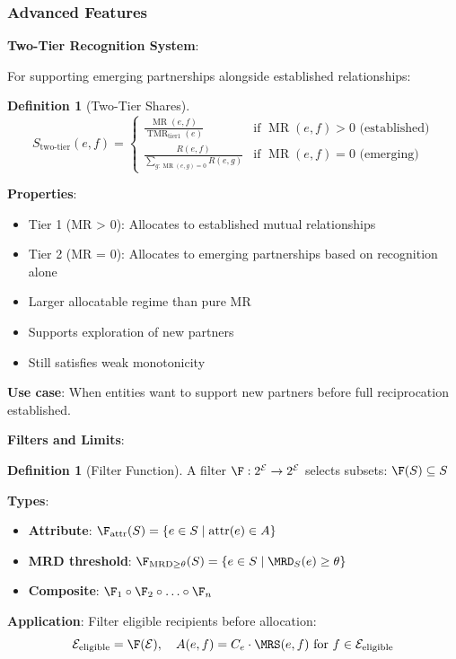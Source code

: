 \documentclass[11pt,a4paper]{article}
\theoremstyle{definition}
\newtheorem{definition}[theorem]{Definition}
\theoremstyle{remark}
\newcommand{\E}{\mathcal{E}}
\DeclareMathOperator{\MR}{MR}
\DeclareMathOperator{\TMR}{TMR}
\begin{document}
\subsubsection{Advanced Features}

\textbf{Two-Tier Recognition System}:

For supporting emerging partnerships alongside established relationships:

\begin{definition}[Two-Tier Shares]
\[ S_{\text{two-tier}}(e,f) = \begin{cases}
\frac{\MR(e,f)}{\TMR_{\text{tier1}}(e)} & \text{if } \MR(e,f) > 0 \text{ (established)} \\
\frac{R(e,f)}{\sum_{g:\MR(e,g)=0} R(e,g)} & \text{if } \MR(e,f) = 0 \text{ (emerging)}
\end{cases} \]

\textbf{Properties}:
\begin{itemize}
\item Tier 1 (MR > 0): Allocates to established mutual relationships
\item Tier 2 (MR = 0): Allocates to emerging partnerships based on recognition alone
\item Larger allocatable regime than pure MR
\item Supports exploration of new partners
\item Still satisfies weak monotonicity
\end{itemize}

\textbf{Use case}: When entities want to support new partners before full reciprocation established.
\end{definition}

\textbf{Filters and Limits}:

\begin{definition}[Filter Function]
A filter $\F: 2^{\E} \to 2^{\E}$ selects subsets: $\F(S) \subseteq S$

\textbf{Types}:
\begin{itemize}
\item \textbf{Attribute}: $\F_{\text{attr}}(S) = \{e \in S \mid \text{attr}(e) \in A\}$
\item \textbf{MRD threshold}: $\F_{\text{MRD} \ge \theta}(S) = \{e \in S \mid \MRD_S(e) \ge \theta\}$
\item \textbf{Composite}: $\F_1 \circ \F_2 \circ \ldots \circ \F_n$
\end{itemize}

\textbf{Application}: Filter eligible recipients before allocation:
\[ \E_{\text{eligible}} = \F(\E), \quad A(e,f) = C_e \cdot \MRS(e,f) \text{ for } f \in \E_{\text{eligible}} \]
\end{definition}
\end{document}
